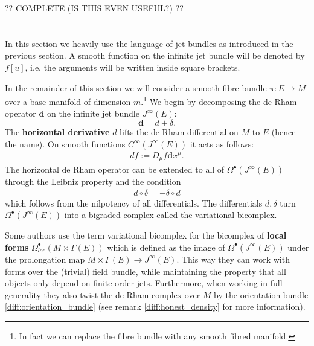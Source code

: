 
    ?? COMPLETE (IS THIS EVEN USEFUL?) ??

\section{}\label{section:variational_bicomplex}

    In this section we heavily use the language of jet bundles as introduced in the previous section. A smooth function on the infinite jet bundle will be denoted by $f[u]$, i.e. the arguments will be written inside square brackets.

    In the remainder of this section we will consider a smooth fibre bundle $\pi:E\rightarrow M$ over a base manifold of dimension $m$.\footnote{In fact we can replace the fibre bundle with any smooth fibred manifold.} We begin by decomposing the de Rham operator $\mathbf{d}$ on the infinite jet bundle $J^\infty(E)$: \[\mathbf{d} = d+\delta.\] The \textbf{horizontal derivative} $d$ lifts the de Rham differential on $M$ to $E$ (hence the name). On smooth functions $C^\infty(J^\infty(E))$ it acts as follows:
    \begin{gather}
        df := D_\mu f\mathbf{d}x^\mu.
    \end{gather}
    The horizontal de Rham operator can be extended to all of $\Omega^\bullet(J^\infty(E))$ through the Leibniz property and the condition
    \begin{gather}
        d\circ\delta = -\delta\circ d
    \end{gather}
    which follows from the nilpotency of all differentials. The differentials $d,\delta$ turn $\Omega^\bullet(J^\infty(E))$ into a bigraded complex called the variational bicomplex.
    \begin{remark}
        Some authors use the term variational bicomplex for the bicomplex of \textbf{local forms} $\Omega^\bullet_{loc}(M\times\Gamma(E))$ which is defined as the image of $\Omega^\bullet(J^\infty(E))$ under the prolongation map $M\times\Gamma(E)\rightarrow J^\infty(E)$. This way they can work with forms over the (trivial) field bundle, while maintaining the property that all objects only depend on finite-order jets. Furthermore, when working in full generality they also twist the de Rham complex over $M$ by the orientation bundle \ref{diff:orientation_bundle} (see remark \ref{diff:honest_density} for more information).
    \end{remark}

